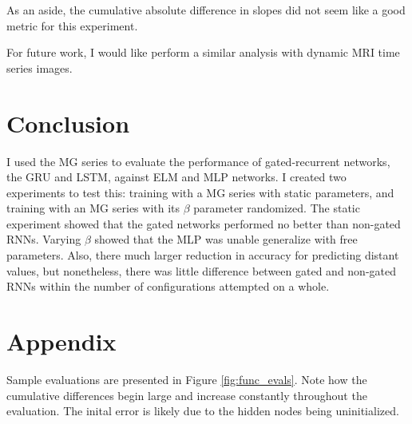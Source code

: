 \documentclass[11pt]{article}
\begin{document}
As an aside, the cumulative absolute difference in slopes did not seem like a good metric for this experiment. %

For future work, I would like perform a similar analysis with dynamic
MRI time series images.

 \section{Conclusion}
I used the MG series to evaluate the performance of gated-recurrent
networks, the GRU and LSTM, against ELM and MLP networks. I created
two  experiments to test this: training with a MG series with
static parameters, and training with an MG series with its $\beta$
parameter randomized. The static experiment showed that the gated
networks performed no better than non-gated RNNs. Varying $\beta$  showed that the MLP was unable generalize with free
parameters. Also, there much larger reduction in accuracy for
predicting distant values, but nonetheless, there was little
difference between gated and non-gated RNNs within the number
of configurations attempted on a whole.
\clearpage



\clearpage
\section*{Appendix}
 Sample evaluations are presented
  in Figure \ref{fig:func_evals}.  Note how the cumulative
   differences begin large and increase constantly throughout the
   evaluation. The inital error is likely due to the hidden nodes being uninitialized.
\end{document}
